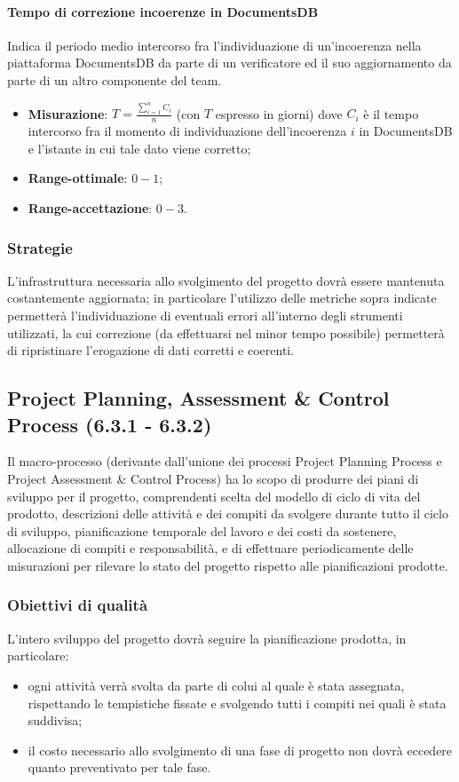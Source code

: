 \paragraph{Tempo di correzione incoerenze in DocumentsDB}
\label{tCorrIncoerDocumentsDB}
Indica il periodo medio intercorso fra l'individuazione di un'incoerenza nella piattaforma DocumentsDB da parte di un verificatore ed il suo aggiornamento da parte di un altro componente del team.
\begin{itemize}
\item \textbf{Misurazione}: $T = \frac{\sum_{i=1}^{n} C_{i}}{n}$ (con $T$ espresso in giorni) dove $C_{i}$ è il tempo intercorso fra il momento di individuazione dell'incoerenza $i$ in DocumentsDB e l'istante in cui tale dato viene corretto;
\item \textbf{Range-ottimale}: $0 - 1$;
\item \textbf{Range-accettazione}: $0 - 3$.
\end{itemize}
\subsubsection{Strategie}
L'infrastruttura necessaria allo svolgimento del progetto dovrà essere mantenuta costantemente aggiornata; in particolare l'utilizzo delle metriche sopra indicate permetterà l'individuazione di eventuali errori all'interno degli strumenti utilizzati, la cui correzione (da effettuarsi nel minor tempo possibile) permetterà di ripristinare l'erogazione di dati corretti e coerenti.
\subsection{Project Planning, Assessment \& Control Process (6.3.1 - 6.3.2)}
\label{projPlanAssControl}
Il macro-processo (derivante dall'unione dei processi Project Planning Process e Project Assessment \& Control Process) ha lo scopo di produrre dei piani di sviluppo per il progetto, comprendenti scelta del modello di ciclo di vita  del prodotto, descrizioni delle attività e dei compiti da svolgere durante tutto il ciclo di sviluppo, pianificazione temporale del lavoro e dei costi da sostenere, allocazione di compiti e responsabilità, e di effettuare periodicamente delle misurazioni per rilevare lo stato del progetto rispetto alle pianificazioni prodotte.
\subsubsection{Obiettivi di qualità}
L'intero sviluppo del progetto dovrà seguire la pianificazione prodotta, in particolare:
\begin{itemize}
\item ogni attività verrà svolta da parte di colui al quale è stata assegnata, rispettando le tempistiche fissate e svolgendo tutti i compiti nei quali è stata suddivisa;
\item il costo necessario allo svolgimento di una fase di progetto non dovrà eccedere quanto preventivato per tale fase.
\end{itemize}
